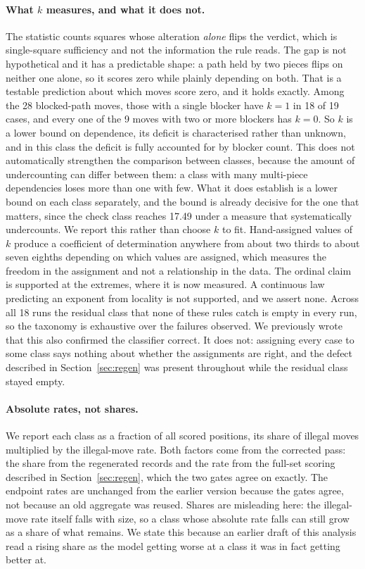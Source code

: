 \documentclass[11pt]{article}
\begin{document}
\paragraph{What $k$ measures, and what it does not.}
The statistic counts squares whose alteration \emph{alone} flips the verdict, which is
single-square sufficiency and not the information the rule reads. The gap is not
hypothetical and it has a predictable shape: a path held by two pieces flips on
neither one alone, so it scores zero while plainly depending on both. That is a
testable prediction about which moves score zero, and it holds exactly. Among the
28 blocked-path moves, those with a single blocker have $k=1$ in 18 of
19 cases, and every one of the 9 moves with two or more blockers has
$k=0$. So $k$ is a lower bound on dependence, its deficit is characterised rather
than unknown, and in this class the deficit is fully accounted for by blocker count.
This does not automatically strengthen the comparison between classes, because the
amount of undercounting can differ between them: a class with many multi-piece
dependencies loses more than one with few. What it does establish is a lower bound on
each class separately, and the bound is already decisive for the one that matters,
since the check class reaches
17.49 under a measure that systematically undercounts.
We report this rather than choose $k$ to fit. Hand-assigned values of $k$ produce a
coefficient of determination anywhere from about two thirds to about seven eighths
depending on which values are assigned, which measures the freedom in the assignment
and not a relationship in the data. The ordinal claim is supported at the extremes,
where it is now measured. A continuous law predicting an exponent from locality is
not supported, and we assert none.
Across all 18 runs the residual class that none of these rules catch
is empty in every run, so the taxonomy is exhaustive over the
failures observed. We previously wrote that this also confirmed the classifier
correct. It does not: assigning every case to some class says nothing about whether
the assignments are right, and the defect described in Section~\ref{sec:regen} was
present throughout while the residual class stayed empty.

\paragraph{Absolute rates, not shares.}
We report each class as a fraction of all scored positions, its share of illegal
moves multiplied by the illegal-move rate. Both factors come from the corrected pass:
the share from the regenerated records and the rate from the full-set scoring
described in Section~\ref{sec:regen}, which the two gates agree on exactly. The
endpoint rates are unchanged from the earlier version because the gates agree, not
because an old aggregate was reused. Shares are misleading here: the
illegal-move rate itself falls with size, so a class whose absolute rate falls can
still grow as a share of what remains. We state this because an earlier draft of
this analysis read a rising share as the model getting worse at a class it was in
fact getting better at.
\end{document}
